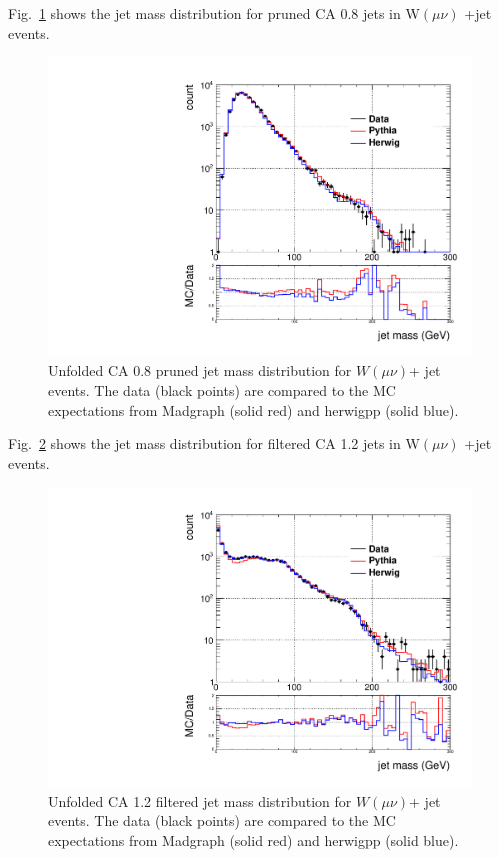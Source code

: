 Fig.~\ref{figs:prunedWmnInt1} shows the jet mass distribution for pruned CA 0.8 jets in W$(\mu\nu)$ +jet events.

\begin{figure}[!htb]
\centering
\includegraphics[width=1.\textwidth]{figs/Wmn/jetmassReco_ca8_allpT.pdf}
\caption{Unfolded CA 0.8 pruned jet mass distribution for $W(\mu\nu)$+ jet events. The data (black points) are compared to the MC expectations from Madgraph (solid red) and herwigpp (solid blue).}
\label{figs:prunedWmnInt1}
\end{figure}


Fig.~\ref{figs:filteredWmnInt1} shows the jet mass distribution for filtered CA 1.2 jets in W$(\mu\nu)$ +jet events.

\begin{figure}[!htb]
\centering
\includegraphics[width=1.\textwidth]{figs/Wmn/jetmassReco_ca12mdft_allpT.pdf}
\caption{Unfolded CA 1.2 filtered jet mass distribution for $W(\mu\nu)$+ jet events. The data (black points) are compared to the MC expectations from Madgraph (solid red) and herwigpp (solid blue).}
\label{figs:filteredWmnInt1}
\end{figure}



